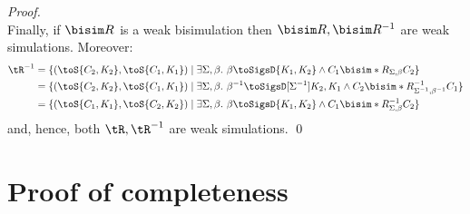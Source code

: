 \begin{proof}
%
\\
  Finally, if $\bisim R$ is a weak bisimulation then $\bisim R,\bisim R^{-1}$ are weak simulations. Moreover:
  \begin{align*}
\tR^{-1} &=  \{
    (\toS{C_2,K_2},\toS{C_1,K_1}) \mid \exists\Sigma,\beta.\ \beta\toSigsD{K_1,K_2}
\land
  C_1\bisim*{R}_{\Sigma,\beta}C_2
           \}\\
     &=  \{
    (\toS{C_2,K_2},\toS{C_1,K_1}) \mid \exists\Sigma,\beta.\ \beta^{-1}\toSigsD[\Sigma^{-1}]{K_2,K_1}
\land
  C_2\bisim*{R}_{\Sigma^{-1},\beta^{-1}}^{-1}C_1
       \}\\
    &=  \{
    (\toS{C_1,K_1},\toS{C_2,K_2}) \mid \exists\Sigma,\beta.\ \beta\toSigsD{K_1,K_2}
\land
  C_1\bisim*{R}_{\Sigma,\beta}^{-1}C_2
           \}
  \end{align*}
  and, hence, both $\tR,\tR^{-1}$ are weak simulations.
\qed
\end{proof}  

\section{Proof of completeness}\label{app:completeness}

